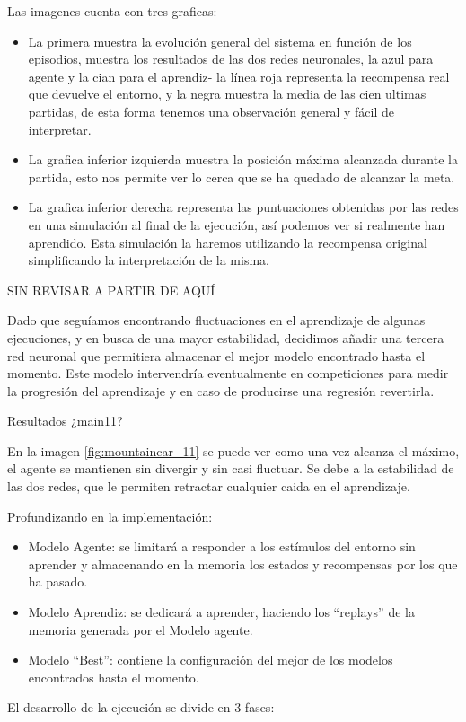 Las imagenes cuenta con tres graficas:
\begin{itemize}
    \item La primera muestra la evolución general del sistema en función de los episodios, muestra los resultados de las dos redes neuronales, la azul para agente y la cian para el aprendiz- la línea roja representa la recompensa real que devuelve el entorno, y la negra muestra la media de las cien ultimas partidas, de esta forma tenemos una observación general y fácil de interpretar.
    \item La grafica inferior izquierda muestra la posición máxima alcanzada durante la partida, esto nos permite ver lo cerca que se ha quedado de alcanzar la meta.
    \item La grafica inferior derecha representa las puntuaciones obtenidas por las redes en una simulación al final de la ejecución, así podemos ver si realmente han aprendido. Esta simulación la haremos utilizando la recompensa original simplificando la interpretación de la misma.  
\end{itemize}
 
SIN REVISAR A PARTIR DE AQUÍ

Dado que seguíamos encontrando fluctuaciones en el aprendizaje de algunas ejecuciones, y en busca de una mayor estabilidad, decidimos añadir una tercera red neuronal que permitiera almacenar el mejor modelo encontrado hasta el momento. Este modelo intervendría eventualmente en competiciones para medir la progresión del aprendizaje y en caso de producirse una regresión revertirla.

%
       {Resultados ¿main11?}

En la imagen \ref{fig:mountaincar_11} se puede ver como una vez alcanza el máximo, el agente se mantienen sin divergir y sin casi fluctuar. Se debe a la estabilidad de las dos redes, que le permiten retractar cualquier caida en el aprendizaje.


Profundizando en la implementación:
\begin{itemize}
 \item Modelo Agente: se limitará a responder a los estímulos del entorno sin aprender y almacenando en la memoria los estados y recompensas por los que ha pasado.
 \item Modelo Aprendiz: se dedicará a aprender, haciendo los ``replays'' de la memoria generada por el Modelo agente.
 \item Modelo ``Best'': contiene la configuración del mejor de los modelos encontrados hasta el momento. 
\end{itemize}
El desarrollo de la ejecución se divide en 3 fases:

